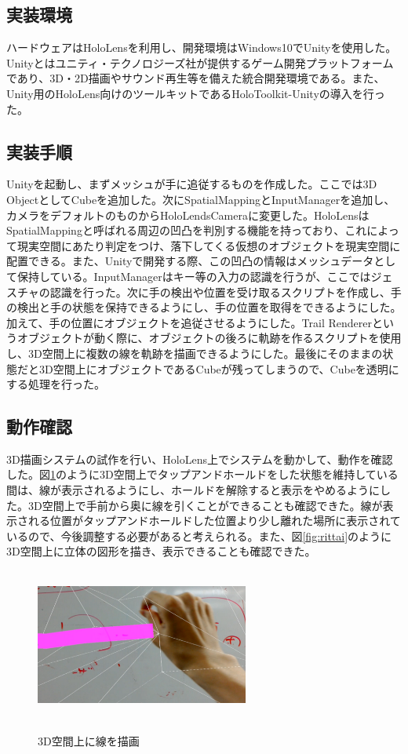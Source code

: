 \documentclass{hissymp}
\begin{document}
\subsection{実装環境}
ハードウェアはHoloLensを利用し、開発環境はWindows10でUnity\cite{tex9}を使用した。Unityとはユニティ・テクノロジーズ社が提供するゲーム開発プラットフォームであり、3D・2D描画やサウンド再生等を備えた統合開発環境である。また、Unity用のHoloLens向けのツールキットであるHoloToolkit-Unityの導入を行った。

\subsection{実装手順}
Unityを起動し、まずメッシュが手に追従するものを作成した。ここでは3D ObjectとしてCubeを追加した。次にSpatialMappingとInputManagerを追加し、カメラをデフォルトのものからHoloLendsCameraに変更した。HoloLensはSpatialMappingと呼ばれる周辺の凹凸を判別する機能を持っており、これによって現実空間にあたり判定をつけ、落下してくる仮想のオブジェクトを現実空間に配置できる。また、Unityで開発する際、この凹凸の情報はメッシュデータとして保持している。InputManagerはキー等の入力の認識を行うが、ここではジェスチャの認識を行った。次に手の検出や位置を受け取るスクリプトを作成し、手の検出と手の状態を保持できるようにし、手の位置を取得をできるようにした。加えて、手の位置にオブジェクトを追従させるようにした。Trail Renderer\cite{tex10}というオブジェクトが動く際に、オブジェクトの後ろに軌跡を作るスクリプトを使用し、3D空間上に複数の線を軌跡を描画できるようにした。最後にそのままの状態だと3D空間上にオブジェクトであるCubeが残ってしまうので、Cubeを透明にする処理を行った。

\subsection{動作確認}
3D描画システムの試作を行い、HoloLens上でシステムを動かして、動作を確認した。図\ref{fig:linedraw}のように3D空間上でタップアンドホールドをした状態を維持している間は、線が表示されるようにし、ホールドを解除すると表示をやめるようにした。3D空間上で手前から奥に線を引くことができることも確認できた。線が表示される位置がタップアンドホールドした位置より少し離れた場所に表示されているので、今後調整する必要があると考えられる。また、図\ref{fig:rittai}のように3D空間上に立体の図形を描き、表示できることも確認できた。

\begin{figure}[h]
  \begin{center}
    \includegraphics[clip,height=5.0cm,width=7.0cm]{./linedraw.eps}
    \caption{3D空間上に線を描画}
    \label{fig:linedraw}
  \end{center}
\end{figure}
\end{document}
